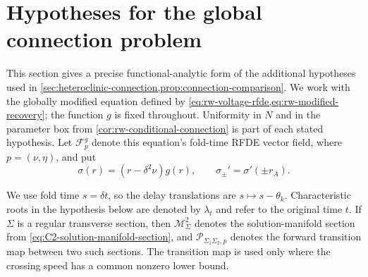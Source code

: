\section{Hypotheses for the global connection problem}
\label{sec:supp-connection-details}

This section gives a precise functional-analytic form of the additional
hypotheses used in
\cref{sec:heteroclinic-connection,prop:connection-comparison}.  We work
with the globally modified equation defined by
\cref{eq:rw-voltage-rfde,eq:rw-modified-recovery}; the function \(g\) is
fixed throughout.  Uniformity in \(N\) and in the parameter box from
\cref{cor:rw-conditional-connection} is part of each stated hypothesis.
Let \(\mathcal F_p^g\) denote this equation's fold-time RFDE vector field,
where \(p=(\nu,\eta)\), and put
\[
 \sigma(r)=(r-\delta^2\nu)g(r),
 \qquad \sigma_\pm'=\sigma'(\pm r_A).
\]

We use fold time \(s=\delta t\), so the delay translations are
\(s\mapsto s-\theta_k\).  Characteristic roots in the hypothesis below are
denoted by \(\lambda_t\) and refer to the original time \(t\).
If \(\Sigma\) is a regular transverse section, then
\(\mathcal M_\Sigma^2\) denotes the solution-manifold section from
\cref{eq:C2-solution-manifold-section}, and
\(\mathcal P_{\Sigma_1\Sigma_2,p}\) denotes the forward transition map
between two such sections.  The transition map is used only where the
crossing speed has
a common nonzero lower bound.

